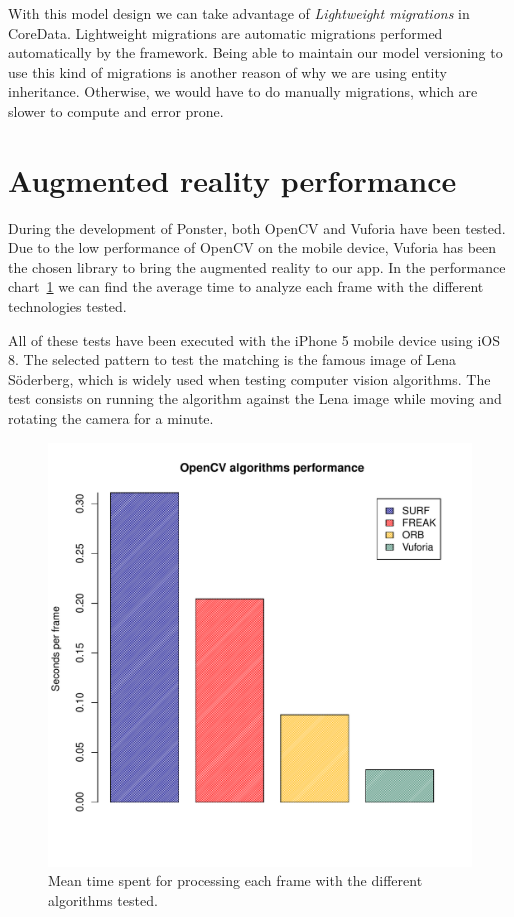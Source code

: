 With this model design we can take advantage of \emph{Lightweight migrations}
in CoreData. Lightweight migrations are automatic migrations performed
automatically by the framework. Being able to maintain our model versioning to
use this kind of migrations is another reason of why we are using entity
inheritance. Otherwise, we would have to do manually migrations, which are
slower to compute and error prone.

\section{Augmented reality performance}
\label{sec:arperf}
During the development of Ponster, both OpenCV and Vuforia have been tested. Due to
the low performance of OpenCV on the mobile device, Vuforia has been the chosen library
to bring the augmented reality to our app. In the performance
chart~\ref{fig:performance} we can find the average time to analyze each frame with
the different technologies tested. 

All of these tests have been executed with the iPhone 5 mobile device using iOS
8. The selected pattern to test the matching is the famous image of Lena Söderberg,
which is widely used when testing computer vision algorithms. The test consists on
running the algorithm against the Lena image while moving and rotating the camera
for a minute.

\begin{figure}
\centering
\includegraphics[scale=0.75]{performance/plot.pdf}
\caption{\label{fig:performance} Mean time spent for processing each frame with the
  different algorithms tested.}
\end{figure} 

